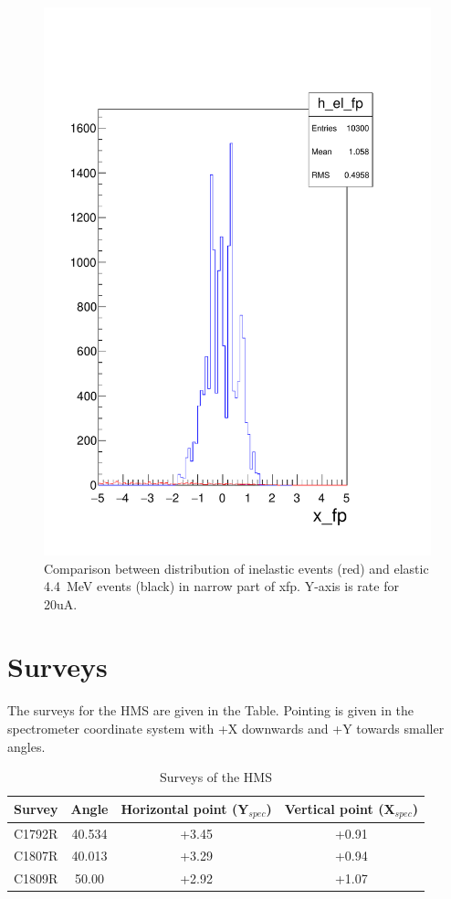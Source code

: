 \documentclass[]{article}
\begin{document}
\begin{figure}	
	\begin{center}
		\includegraphics[width=0.98\columnwidth]{hms_pointtarg_13p5deg_2gev_wc_mscat_vac_sieve_car44_xfp.pdf}
	\end{center}
	\caption{Comparison between distribution of inelastic events (red) and elastic 4.4~MeV events (black)
		 in narrow part of xfp. Y-axis is rate for 20uA.  }
	\label{fig:xfp}
\end{figure}


\section{Surveys}

The surveys for the HMS are given in the Table.  Pointing is given in the spectrometer 
coordinate system with +X downwards and +Y towards smaller angles.
	\begin{table}[h]
		\begin{center}
			\begin{tabular}[]{|c|c||c|c|} \hline\hline
				Survey & Angle  & Horizontal point (Y$_{spec}$) & Vertical point (X$_{spec}$)\\ \hline
				C1792R & 40.534 & +3.45& +0.91\\ \hline
				C1807R & 40.013 & +3.29 & +0.94 \\ \hline
				C1809R & 50.00  & +2.92 & +1.07 \\ \hline
			\end{tabular}
			\caption{Surveys of the HMS}
		\end{center}
	\end{table}
	
\end{document}
